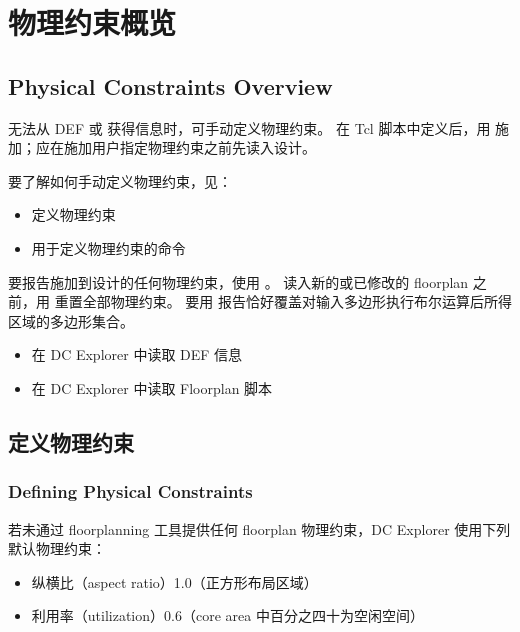 \section{物理约束概览}
\subsection*{Physical Constraints Overview}

无法从 DEF 或  获得信息时，可手动定义物理约束。
在 Tcl 脚本中定义后，用  施加；应在施加用户指定物理约束之前先读入设计。

要了解如何手动定义物理约束，见：
\begin{itemize}
  \item 定义物理约束
  \item 用于定义物理约束的命令
\end{itemize}

要报告施加到设计的任何物理约束，使用 。
读入新的或已修改的 floorplan 之前，用  重置全部物理约束。
要用  报告恰好覆盖对输入多边形执行布尔运算后所得区域的多边形集合。

\begin{seeAlsoBox}
\begin{itemize}
  \item 在 DC Explorer 中读取 DEF 信息
  \item 在 DC Explorer 中读取 Floorplan 脚本
\end{itemize}
\end{seeAlsoBox}

\subsection{定义物理约束}
\subsubsection*{Defining Physical Constraints}

若未通过 floorplanning 工具提供任何 floorplan 物理约束，DC Explorer 使用下列默认物理约束：
\begin{itemize}
  \item 纵横比（aspect ratio）1.0（正方形布局区域）
  \item 利用率（utilization）0.6（core area 中百分之四十为空闲空间）
\end{itemize}

